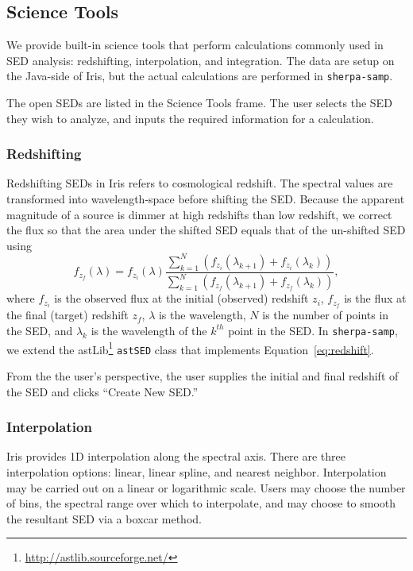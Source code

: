 \documentclass[preprint,authoryear,5p]{elsarticle}
\begin{document}
\subsection{Science Tools} We provide built-in science tools that perform
calculations commonly used in SED analysis: redshifting, interpolation, and
integration. The data are setup on the Java-side of Iris, but the actual
calculations are performed in \verb|sherpa-samp|.

The open SEDs are listed in the Science Tools frame. The user selects the SED
they wish to analyze, and inputs the required information for a calculation.

\subsubsection{Redshifting} Redshifting SEDs in Iris refers to cosmological
redshift. The spectral values are transformed into wavelength-space before 
shifting the SED.
Because the apparent magnitude of a source is dimmer at high redshifts
than low redshift, we correct the flux so that the area under the shifted SED
equals that of the un-shifted SED using
\begin{equation}
\label{eq:redshift} 
f_{z_{f}}(\lambda) = f_{z_{i}}(\lambda) \frac{\sum_{k=1}^N
(f_{z_{i}}(\lambda_{k+1})+f_{z_{i}}(\lambda_{k}))}{\sum_{k=1}^N
(f_{z_{f}}(\lambda_{k+1})+f_{z_{f}}(\lambda_{k}))}, 
\end{equation}
where $f_{z_i}$ is the observed flux at the initial (observed) redshift $z_i$,
$f_{z_f}$ is the flux at the final (target) redshift $z_f$, ${\lambda}$ is the
wavelength, $N$ is the number of points in the SED, and $\lambda_{k}$ is the wavelength
of the $k^{th}$ point in the SED. In \verb|sherpa-samp|, we extend the
astLib\footnote{\url{http://astlib.sourceforge.net/}} \texttt{astSED} class that
implements Equation~\ref{eq:redshift}.

From the the user's perspective, the user supplies the initial and final redshift of the
SED and clicks ``Create New SED.''

\subsubsection{Interpolation} Iris provides 1D interpolation along the spectral
axis. There are three interpolation options: linear, linear spline, and nearest
neighbor. Interpolation may be carried out on a linear or logarithmic scale.
Users may choose the number of bins, the spectral range over which to
interpolate, and may choose to smooth the resultant SED via a boxcar method.
\end{document}
